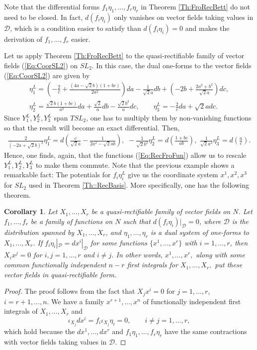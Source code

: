 \documentclass[12pt]{article}
\theoremstyle{plain}
\newtheorem{corollary}[theorem]{Corollary}
\theoremstyle{definition}
\numberwithin{equation}{section}
\begin{document}
Note that the differential forms $f_1\eta_1,\ldots,f_r\eta_r$ in Theorem \ref{Th:FroRecBett} do not need to be closed. In fact, $d(f_i\eta_i)$ only vanishes on vector fields taking values in $\mathcal{D}$, which is a condition easier to satisfy than $d(f_i\eta_i)=0$ and makes the derivation of $f_1,\ldots,f_r$ easier.

Let us apply Theorem \ref{Th:FroRecBett} to the quasi-rectifiable family of vector fields (\ref{Eq:CoorSL2}) on $SL_2$. In this case, the dual one-forms to the vector fields (\ref{Eq:CoorSL2}) are given by
$$
\begin{gathered}
\eta^L_1=\left(-\frac{2}c+\frac{(4a-\sqrt{2}b)(1+bc)}{2a^2}\right)da-\frac{1}{\sqrt{2}a}db+\left(-2b+\frac{2a^2+b^2}{\sqrt{2}a}\right)dc,\\
\eta^L_2=\frac{\sqrt{2}b(1+bc)}{a^2}da+\frac{\sqrt{2}}{a}db-\frac{\sqrt{2}b^2}{a}dc,\qquad
\eta^L_3=-\frac{2}cda+\sqrt{2}a dc.
\end{gathered}
$$
Since $Y^L_1,Y^L_2,Y^L_3$ span $TSL_2$, one has to multiply them by non-vanishing functions so that the result will become an exact differential. Then,
$$
\begin{gathered}
\frac{2}{(-2a+\sqrt{2} b)^2}\eta^L_1=d\left(\frac{c}{\sqrt{2}a}-\frac{1}{2a^2-\sqrt{2} ab}\right),\,\,
-\frac{1}{\sqrt{2}b^2}\eta^L_2=d\left(\frac{1+bc}{ab}\right),\,\,
\frac{1}{\sqrt{2} a^2}\eta^L_3=d\left(\frac{a}{c}\right).
\end{gathered}
$$
Hence, one finds, again, that the functions (\ref{Eq:RecFroFun}) allow us to rescale $Y_1^L,Y_2^L,Y_3^L$ to make them commute. Note that the previous example shows a remarkable fact: The potentials for $f_i\eta^L_i$ give us the coordinate system $x^1,x^2,x^3$ for $SL_2$ used in Theorem \ref{Th::RecBasis}. More specifically, one has the following theorem.

\begin{corollary}\label{Cor:Double} Let $X_1,\ldots,X_r$ be a quasi-rectifiable family of vector fields on $N$. Let $f_1,\ldots,f_r$ be a family of functions on $N$ such that $d(f_i\eta_i)|_{\mathcal{D}}=0$, where $\mathcal{D}$ is the distribution spanned by $X_1,\ldots,X_r$, and $\eta_1,\ldots,\eta_r$ is a dual system of one-forms to $X_1,\ldots,X_r$. If $f_i\eta_i|_{\mathcal{D}}=dx^i|_{\mathcal{D}}$ for some functions $\{x^1,\ldots,x^r\}$ with $i=1,\ldots,r$, then $X_ix^j=0$ for $i,j=1,\ldots,r$ and $i\neq j$. In other words,  $x^1,\ldots,x^r,$ along with some common functionally independent $n-r$ first integrals  for $X_1,\ldots,X_r,$ put these vector fields in quasi-rectifiable form.
\end{corollary}
\begin{proof} The proof follows from the fact that $X_jx^i=0$ for $j=1,\ldots,r$, $i=r+1,\ldots,n$. We have a family $x^{r+1},\ldots,x^n$ of functionally independent first integrals of $X_1,\ldots,X_r$ and
$$
\iota_{X_j}dx^i=f_i\iota_{X_j}\eta_i=0,\qquad i\neq j=1,\ldots,r,
$$
which hold because the $dx^1,\ldots,dx^r$ and $f_1\eta_1,\ldots,f_r\eta_r$ have the same contractions with vector fields taking values in $\mathcal{D}$.
\end{proof}
\end{document}
